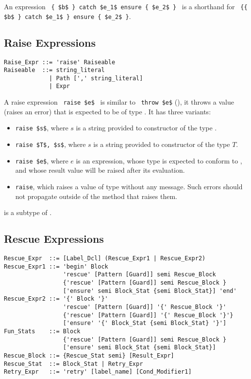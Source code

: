 An expression ~\lstinline!{ $b$ } catch $e_1$ ensure { $e_2$ }!~ is a shorthand for ~\lstinline!{{ $b$ } catch $e_1$ } ensure { $e_2$ }!. 





\subsection{Raise Expressions}

\syntax\begin{lstlisting}
Raise_Expr ::= 'raise' Raiseable
Raiseable  ::= string_literal
             | Path [',' string_literal]
             | Expr
\end{lstlisting}

A raise expression ~\lstinline!raise $e$!~ is similar to ~\lstinline!throw $e$! (), it throws a value (raises an error) that is expected to be of type . It has three variants: 
\begin{itemize}
\item[] \lstinline!raise $s$!, where $s$ is a string provided to constructor of the type . 
\item[] \lstinline!raise $T$, $s$!, where $s$ is a string provided to constructor of the type $T$. 
\item[] \lstinline!raise $e$!, where $e$ is an expression, whose type is expected to conform to , and whose result value will be raised after its evaluation. 
\item[] \lstinline!raise!, which raises a value of type  without any message. Such errors should not propagate outside of the method that raises them. 
\end{itemize}

 is a subtype of . 







\subsection{Rescue Expressions}

\syntax\begin{lstlisting}
Rescue_Expr  ::= [Label_Dcl] (Rescue_Expr1 | Rescue_Expr2)
Rescue_Expr1 ::= 'begin' Block 
                 'rescue' [Pattern [Guard]] semi Rescue_Block
                 {'rescue' [Pattern [Guard]] semi Rescue_Block }
                 ['ensure' semi Block_Stat {semi Block_Stat}] 'end'
Rescue_Expr2 ::= '{' Block '}' 
                 'rescue' [Pattern [Guard]] '{' Rescue_Block '}'
                 {'rescue' [Pattern [Guard]] '{' Rescue_Block '}'}
                 ['ensure' '{' Block_Stat {semi Block_Stat} '}']
Fun_Stats    ::= Block
                 {'rescue' [Pattern [Guard]] semi Rescue_Block }
                 ['ensure' semi Block_Stat {semi Block_Stat}]
Rescue_Block ::= {Rescue_Stat semi} [Result_Expr]
Rescue_Stat  ::= Block_Stat | Retry_Expr
Retry_Expr   ::= 'retry' [label_name] [Cond_Modifier1]
\end{lstlisting}

